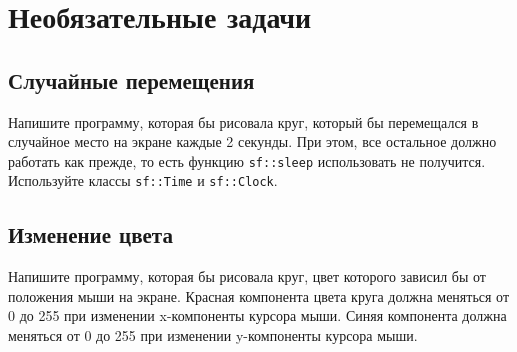 \documentclass{article}
\begin{document}
\newpage
\section{Необязательные задачи}
\subsection{Случайные перемещения}
Напишите программу, которая бы рисовала круг, который бы перемещался в случайное место на экране каждые 2 секунды. При этом, все остальное должно работать как прежде, то есть функцию \texttt{sf::sleep} использовать не получится. Используйте классы \texttt{sf::Time} и \texttt{sf::Clock}.


\subsection{Изменение цвета}
Напишите программу, которая бы рисовала круг, цвет которого зависил бы от положения мыши на экране.
Красная компонента цвета круга должна меняться от 0 до 255 при изменении x-компоненты курсора мыши.
Синяя компонента должна меняться от 0 до 255 при изменении y-компоненты курсора мыши.
\end{document}
